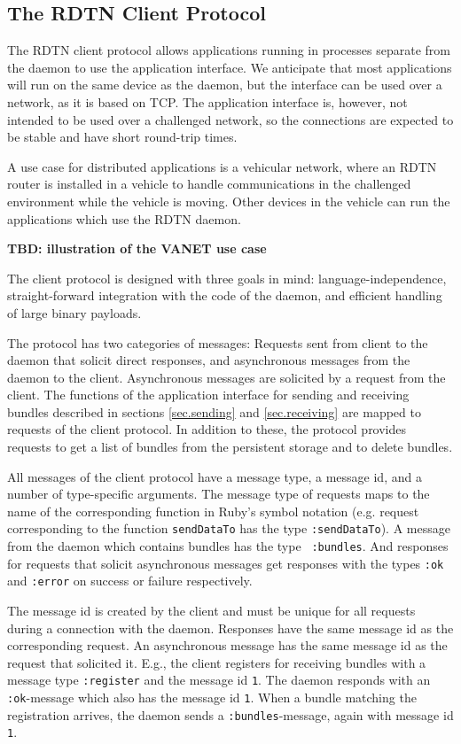 \documentclass[a4paper]{article}
\begin{document}
\subsection{The RDTN Client Protocol}\label{sec.client-protocol}

The RDTN client protocol allows applications running in processes separate from
the daemon to use the application interface. We anticipate that most
applications will run on the same device as the daemon, but the interface can be
used over a network, as it is based on TCP. The application interface is,
however, not intended to be used over a challenged network, so the connections
are expected to be stable and have short round-trip times.

A use case for distributed applications is a vehicular network, where an RDTN
router is installed in a vehicle to handle communications in the challenged
environment while the vehicle is moving. Other devices in the vehicle can run
the applications which use the RDTN daemon.

{\bf TBD: illustration of the VANET use case}

The client protocol is designed with three goals in mind: language-independence,
straight-forward integration with the code of the daemon, and efficient
handling of large binary payloads. 

The protocol has two categories of messages: Requests sent from client to the
daemon that solicit direct responses, and asynchronous messages from the daemon
to the client. Asynchronous messages are solicited by a request from the client.
The functions of the application interface for sending and receiving bundles described in sections
\ref{sec.sending} and \ref{sec.receiving} are mapped to requests of the client
protocol. In addition to these, the protocol provides requests to get a list of
bundles from the persistent storage and to delete bundles.

All messages of the client protocol have a message type, a message id, and a
number of type-specific arguments. The message type of requests maps to the name
of the corresponding function in Ruby's symbol notation (e.g. request
corresponding to the function {\tt sendDataTo} has the type {\tt :sendDataTo}).
A message from the daemon which contains bundles has the type {\tt
:bundles}. And responses for requests that solicit asynchronous messages get
responses with the types {\tt :ok} and {\tt :error} on success or failure
respectively.

The message id is created by the client and must be unique for all requests
during a connection with the daemon. Responses have the same message id as the
corresponding request. An asynchronous message has the same message id as the
request that solicited it. E.g., the client registers for receiving bundles with
a message type {\tt :register} and the message id {\tt 1}. The daemon responds
with an {\tt :ok}-message which also has the message id {\tt 1}. When a bundle
matching the registration arrives, the daemon sends a {\tt :bundles}-message,
again with message id {\tt 1}.
\end{document}
